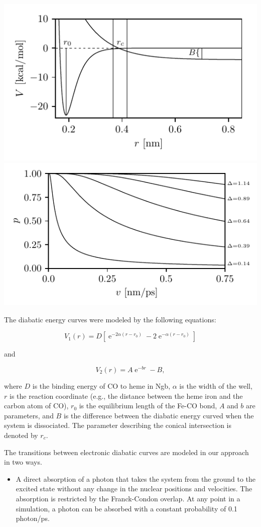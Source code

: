 \documentclass[a0,portrait]{a0poster}
\newcommand{\bi}{\item[\color{myblue}\ding{108}]}
\begin{document}
\begin{multicols}{2}
\begin{center}
	\includegraphics[clip,width=0.48\columnwidth]{figs2.pdf}%
	\includegraphics[clip,width=0.52\columnwidth]{figs3.pdf}%
\end{center}

\vspace{1cm}

The diabatic energy curves were modeled by the following equations:  

\begin{equation}
	V_1(r)=D\left[\operatorname{e}^{-2\alpha(r-r_0)}-2\operatorname{e}^{-\alpha(r-r_0)}\right]
\end{equation}

and

\begin{equation}
	V_2(r)=A\operatorname{e}^{-br}-B,
\end{equation}

where $D$ is the binding energy of CO to heme in Ngb, $\alpha$ is the width of the well, $r$  is the reaction coordinate (e.g., the distance between the heme iron and the carbon atom of CO), $r_0$ is the equilibrium length of the Fe-CO bond, $A$ and $b$ are parameters, and $B$ is the difference between the diabatic energy curved when the system is dissociated. The parameter describing the conical intersection is denoted by $r_c$.

The transitions between electronic diabatic curves are modeled in our approach in two ways. 
\begin{itemize}
	\bi A direct absorption of a photon that takes the system from the ground to the excited state without any change in the nuclear positions and velocities. The absorption is restricted by the Franck-Condon overlap. At any point in a simulation, a photon can be absorbed with a constant probability of 0.1 photon/ps.


\end{itemize}
\end{multicols}
\end{document}
